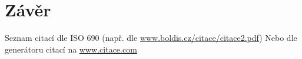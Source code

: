 \documentclass[12pt,a4paper]{article} %
\begin{document}








\section{Závěr} %

\lipsum[12-13]


\begin{thebibliography}{99} %

 Seznam citací dle ISO 690 (např. dle \url{www.boldis.cz/citace/citace2.pdf})
 Nebo dle generátoru citací na \url{www.citace.com}
 
\end{thebibliography}

\end{document}
